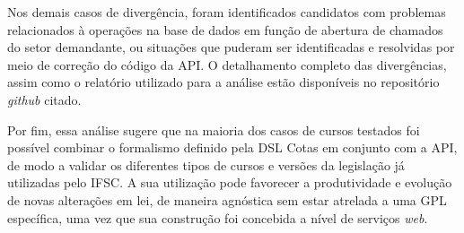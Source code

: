 Nos demais casos de divergência, foram identificados candidatos com problemas relacionados à operações na base de dados em função de abertura de chamados do setor demandante, ou situações que puderam ser identificadas e resolvidas por meio de correção do código da API. O detalhamento completo das divergências, assim como o relatório utilizado para a análise estão disponíveis no repositório \textit{github} citado.

Por fim, essa análise sugere que na maioria dos casos de cursos testados foi possível combinar o formalismo definido pela DSL Cotas em conjunto com a API, de modo a validar os diferentes tipos de cursos e versões da legislação já utilizadas pelo \gls{IFSC}. A sua utilização pode favorecer a produtividade e evolução de novas alterações em lei, de maneira agnóstica sem estar atrelada a uma \gls{GPL} específica, uma vez que sua construção foi concebida a nível de serviços \textit{web}.